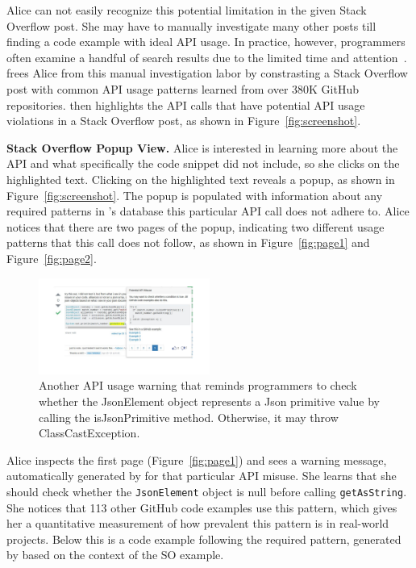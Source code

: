 Alice can not easily recognize this potential limitation in the given Stack Overflow post. She may have to manually investigate many other posts till finding a code example with ideal API usage. In practice, however, programmers often examine a handful of search results due to the limited time and attention~\cite{brandt2009two, starke2009working, duala2012asking}. {\tool} frees Alice from this manual investigation labor by constrasting a Stack Overflow post with common API usage patterns learned from over 380K GitHub repositories. {\tool} then highlights the API calls that have potential API usage violations in a Stack Overflow post, as shown in Figure~\ref{fig:screenshot}. 

{\bf Stack Overflow Popup View.} Alice is interested in learning more about the API and what specifically the code snippet did not include, so she clicks on the highlighted text. Clicking on the highlighted text reveals a popup, as shown in Figure~\ref{fig:screenshot}. The popup is populated with information about any required patterns in {\tool}'s database this particular API call does not adhere to. Alice notices that there are two pages of the popup, indicating two different usage patterns that this call does not follow, as shown in Figure~\ref{fig:page1} and Figure~\ref{fig:page2}. 

\begin{figure}
\centering
\includegraphics[width=0.5\textwidth]{soap-v2-2.pdf}
  \vspace{.1in}
  \caption{Another API usage warning that reminds programmers to check whether the {\ttt JsonElement} object represents a Json primitive value by calling the {\ttt isJsonPrimitive} method. Otherwise, it may throw  {\ttt ClassCastException}.}
  \label{fig:screenshot2}
\end{figure}

Alice inspects the first page (Figure~\ref{fig:page1}) and sees a warning message, automatically generated by {\soa} for that particular API misuse. She learns that she should check whether the {\tt JsonElement} object is null before calling {\tt getAsString}. She notices that 113 other GitHub code examples use this pattern, which gives her a quantitative measurement of how prevalent this pattern is in real-world projects. Below this is a code example following the required pattern, generated by {\soa} based on the context of the SO example.


